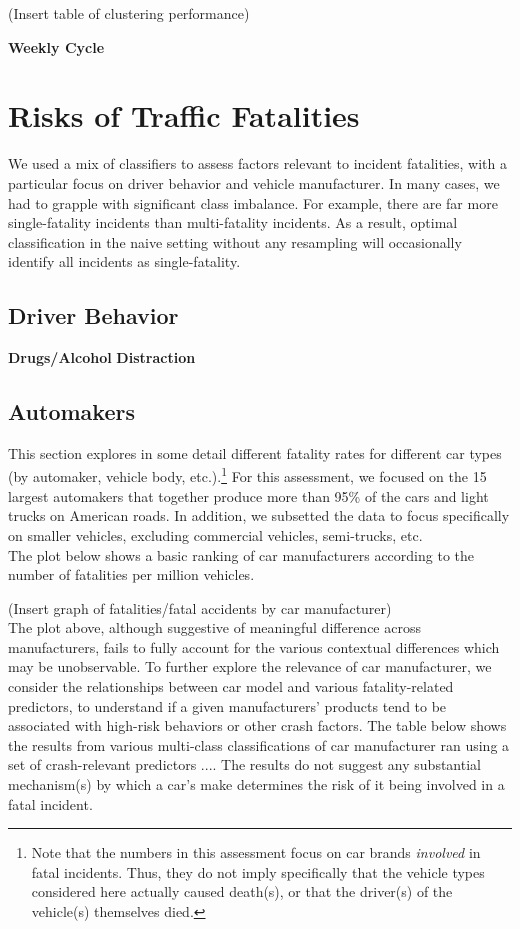 \documentclass[11pt, oneside]{article}   	%
\begin{document}
(Insert table of clustering performance)

\textbf{Weekly Cycle} \\

\section*{Risks of Traffic Fatalities}
We used a mix of classifiers to assess factors relevant to incident fatalities, with a particular focus on driver behavior and vehicle manufacturer. In many cases, we had to grapple with significant class imbalance. For example, there are far more single-fatality incidents than multi-fatality incidents. As a result, optimal classification in the naive setting without any resampling will occasionally identify all incidents as single-fatality.   

\subsection*{Driver Behavior}
\textbf{Drugs/Alcohol}
\textbf{Distraction}

\subsection*{Automakers}

This section explores in some detail different fatality rates for different car types (by automaker, vehicle body, etc.).\footnote{Note that the numbers in this assessment focus on car brands \textit{involved} in fatal incidents. Thus, they do not imply specifically that the vehicle types considered here actually caused death(s), or that the driver(s) of the vehicle(s) themselves died.} For this assessment, we focused on the 15 largest automakers that together produce more than 95\% of the cars and light trucks on American roads. In addition, we subsetted the data to focus specifically on smaller vehicles, excluding commercial vehicles, semi-trucks, etc. \\

The plot below shows a basic ranking of car manufacturers according to the number of fatalities per million vehicles.

(Insert graph of fatalities/fatal accidents by car manufacturer) \\


The plot above, although suggestive of meaningful difference across manufacturers, fails to fully account for the various contextual differences which may be unobservable. To further explore the relevance of car manufacturer, we consider the relationships between car model and various fatality-related predictors, to understand if a given manufacturers' products tend to be associated with high-risk behaviors or other crash factors. The table below shows the results from various multi-class classifications of car manufacturer ran using a set of crash-relevant predictors .... The results do not suggest any substantial mechanism(s) by which a car's make determines the risk of it being involved in a fatal incident. \\
\end{document}
